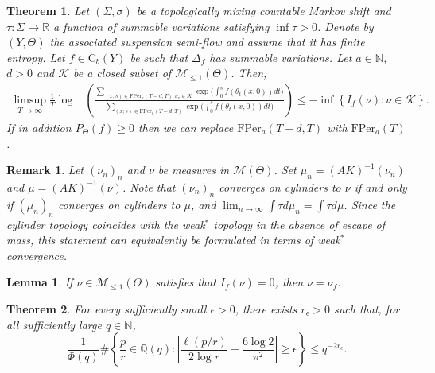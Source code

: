 \documentclass[10pt,a4paper]{amsart}
\newtheorem{theorem}{Theorem}
\newtheorem{remark}{Remark}
\newtheorem{lemma}{Lemma}
\newcommand{\K}{\mathcal{K}}
\newcommand{\M}{\mathcal{M}}
\newcommand{\N}{\mathbb{N}}
\def\Q{{\mathbb Q}}
\newcommand{\R}{\mathbb{R}}
\def\ge{\geqslant}
\def\le{\leqslant}
\begin{document}
\begin{theorem}\label{thm_ldp2} Let $(\Sigma,\sigma)$ be a topologically mixing countable Markov shift and  $\tau:\Sigma\to\R$ a function of summable variations satisfying $\inf\tau>0$. Denote by  $(Y,\Theta)$ the associated suspension semi-flow and assume that it has finite entropy. Let $f\in \mathrm{C}_b(Y)$ be such that  $\Delta_f$ has summable variations. Let $a\in \N$, $d>0$ and $\mathcal{K}$ be a closed subset of $\M_{\le 1}(\Theta)$. Then,
\begin{align*}
\limsup_{T \to \infty} \frac{1}{T} \log  &\left(\frac{\sum_{(x;s)\in \mathrm{FPer}_a(T-d,T), \nu_{x}\in \mathcal{K}}\exp\big(\int_0^{s}f(\theta_t(x,0))dt\big)}{\sum_{(x;s)\in \mathrm{FPer}_a(T-d,T)}\exp\big(\int_0^{s}f(\theta_t(x,0))dt\big)}\right) \leq - \inf \left\{I_f(\nu) : \nu \in \K \right\}.
\end{align*}
If in addition $P_{\Theta}(f)\ge0$ then we can replace $\mathrm{FPer}_a(T-d,T)$ with $\mathrm{FPer}_a(T)$.  
\end{theorem}

\begin{remark}\label{rem:convprob} Let $(\nu_n)_n$ and $\nu$ be measures in  $\M(\Theta)$. Set $\mu_n=(AK)^{-1}(\nu_n)$ and $\mu=(AK)^{-1}(\nu)$. Note that $(\nu_n)_n$ converges on cylinders to $\nu$ if and only if $(\mu_n)_n$ converges on cylinders to $\mu$, and $\lim_{n\to\infty}\int \tau d\mu_n=\int \tau d\mu$. Since the cylinder topology coincides with the weak$^\ast$ topology in the absence of escape of mass, this statement can equivalently be formulated in terms of weak$^\ast$ convergence.
\end{remark}

\begin{lemma} \label{lem:beta} If $\nu\in \M_{\le1}(\Theta)$ satisfies that $I_f(\nu)=0$, then $\nu=\nu_f$. 
\end{lemma}

\begin{theorem}\label{thm:prob}
For every sufficiently small $\epsilon>0$, there exists $r_\epsilon>0$ such that, for all sufficiently large $q\in\mathbb N$,
\[
\frac{1}{\Phi(q)}
\#
\left\{
\frac{p}{r}\in\Q(q):
\left|
\frac{\ell(p/r)}{2\log r}
-
\frac{6\log 2}{\pi^2}
\right|
\geq \epsilon
\right\}
\leq q^{-2r_\epsilon}.
\]
\end{theorem}
\end{document}
